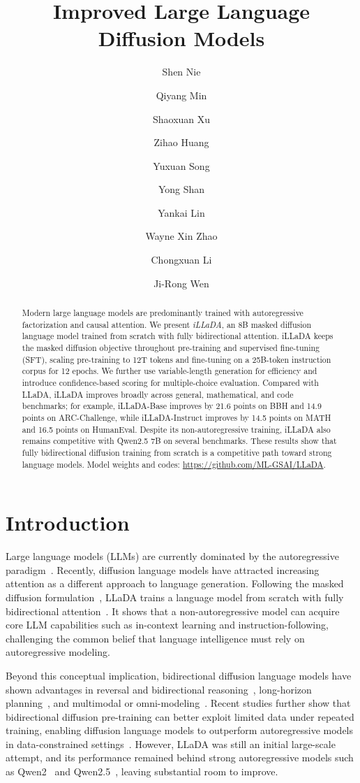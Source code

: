 \documentclass{llmxive}
\title{Improved Large Language Diffusion Models}
\author{Shen Nie \and Qiyang Min \and Shaoxuan Xu \and Zihao Huang \and Yuxuan Song \and Yong Shan \and Yankai Lin \and Wayne Xin Zhao \and Chongxuan Li \and Ji-Rong Wen}
\begin{document}
\maketitle
\begin{abstract}
Modern large language models are predominantly trained with autoregressive factorization and causal attention. We present \emph{iLLaDA}, an 8B masked diffusion language model trained from scratch with fully bidirectional attention. iLLaDA keeps the masked diffusion objective throughout pre-training and supervised fine-tuning (SFT), scaling pre-training to 12T tokens and fine-tuning on a 25B-token instruction corpus for 12 epochs. We further use variable-length generation for efficiency and introduce confidence-based scoring for multiple-choice evaluation. Compared with LLaDA, iLLaDA improves broadly across general, mathematical, and code benchmarks; for example, iLLaDA-Base improves by 21.6 points on BBH and 14.9 points on ARC-Challenge, while iLLaDA-Instruct improves by 14.5 points on MATH and 16.5 points on HumanEval. Despite its non-autoregressive training, iLLaDA also remains competitive with Qwen2.5 7B on several benchmarks. These results show that fully bidirectional diffusion training from scratch is a competitive path toward strong language models. Model weights and codes: \url{https://github.com/ML-GSAI/LLaDA}.
\end{abstract}
\section{Introduction}
\label{sec:introduction}

Large language models (LLMs) are currently dominated by the autoregressive paradigm~\citep{zhao2023survey,brown2020language,chatgpt,dubey2024llama}. Recently, diffusion language models have attracted increasing attention as a different approach to language generation. Following the masked diffusion formulation~\citep{austin2021structured,lou2023discrete,shi2024simplified,sahoo2024simple,ou2024your}, LLaDA trains a language model from scratch with fully bidirectional attention~\citep{nie2026large}. It shows that a non-autoregressive model can acquire core LLM capabilities such as in-context learning and instruction-following, challenging the common belief that language intelligence must rely on autoregressive modeling.

Beyond this conceptual implication, bidirectional diffusion language models have shown advantages in reversal and bidirectional reasoning~\citep{nie2026large,nie2024scaling}, long-horizon planning~\citep{ye2025beyondplanning}, and multimodal or omni-modeling~\citep{you2025llada,yang2025mmada,you2026lladao,xin2025luminadimoo}. Recent studies further show that bidirectional diffusion pre-training can better exploit limited data under repeated training, enabling diffusion language models to outperform autoregressive models in data-constrained settings~\citep{prabhudesai2025diffusion,ni2025diffusion}. However, LLaDA was still an initial large-scale attempt, and its performance remained behind strong autoregressive models such as Qwen2~\citep{qwen2} and Qwen2.5~\citep{qwen2.5}, leaving substantial room to improve.
\end{document}
